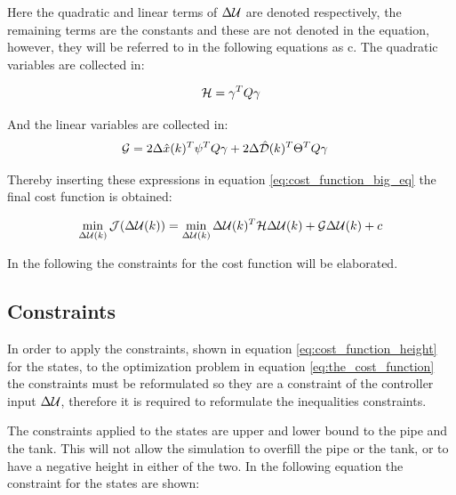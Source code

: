 Here the quadratic and linear terms of $\Delta \CMcal{U}$ are denoted respectively, the remaining terms are the constants and these are not denoted in the equation, however, they will be referred to in the following equations as c. The quadratic variables are collected in: 

\begin{equation}\label{eq:quadratic_h_matrix}
	\CMcal{H} = \gamma^T Q\gamma 
\end{equation}

And the linear variables are collected in:
\begin{equation}
	\begin{aligned}
	\CMcal{G} &= 2 \Delta \hat{x}(k)^T\psi^T Q \gamma+2 \Delta \hat{\CMcal{D}}(k)^T\Theta^T Q \gamma 
	\end{aligned}
\end{equation}

Thereby inserting these expressions in equation \ref{eq:cost_function_big_eq} the final cost function is obtained:

\begin{equation}\label{eq:the_cost_function}
	\min_{\Delta \CMcal{U}(k)} \CMcal{J}(\Delta \CMcal{U}(k)) =\min_{\Delta \CMcal{U}(k)} \Delta \CMcal{U}(k)^T\CMcal{H}\Delta \CMcal{U}(k)+\CMcal{G}\Delta \CMcal{U}(k)+c
\end{equation}

In the following the constraints for the cost function will be elaborated. 

\subsection{Constraints}\label{subse:constraints}

In order to apply the constraints, shown in equation \ref{eq:cost_function_height} for the states, to the optimization problem in equation \ref{eq:the_cost_function} the constraints must be reformulated so they are a constraint of the controller input $\Delta\CMcal{U}$, therefore it is required to reformulate the inequalities constraints. 

The constraints applied to the states are upper and lower bound to the pipe and the tank. This will not allow the simulation to overfill the pipe or the tank, or to have a negative height in either of the two. In the following equation the constraint for the states are shown:  


